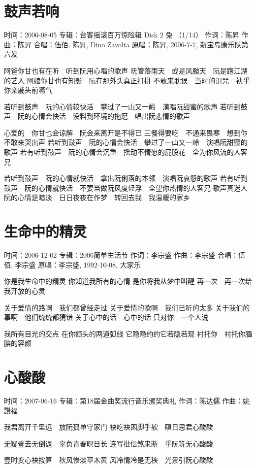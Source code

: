 \documentclass[UTF8,a4paper,oneside,twocolumn,12pt]{ctexbook}
\newcommand{\infopair}[2]{\textbullet #1：#2}
\newcommand{\zc}[1][伍佰]{\infopair{作词}{#1}}
\newcommand{\zq}[1][伍佰]{\infopair{作曲}{#1}}
\newcommand{\zj}[1]{\infopair{专辑}{#1}}
\newcommand{\yc}[1]{\infopair{原唱}{#1}}
\newcommand{\sj}[1]{\infopair{时间}{#1}}
\newenvironment{info}{\begin{flushleft}\kaishu
	}
	{\end{flushleft}\normalsize\yahei\par}
\newenvironment{lyric}{
	}
{}
\begin{document}
\section{鼓声若响}
\begin{info}
	\sj{2006-08-05}
	\zj{台客摇滚百万惊险辑 Disk 2 兔 （1/14）}
	\zc[陈昇]
	\zq[陈昇]
	\infopair{合唱}{伍佰, 陈昇, Dino Zavolta}
	\yc{陈昇, 2006-7-7, 新宝岛康乐队第六发}
\end{info}
\begin{lyric}
	阿爸你甘也有在听　听到阮用心唱的歌声
	呒管落雨天　或是风颱天　阮是跑江湖的艺人
	阿娘你甘也有知影　阮在那外头真正打拼
	不敢来耽误　当时的诅咒　袂乎你亲戚头前嚥气

	若听到鼓声　阮的心情较快活　攀过了一山又一岭　演唱阮甜蜜的歌声
	若听到鼓声　阮的心情会快活　没料到环境的拖磨　唱出阮悲情的歌声

	心爱的　你甘也会谅解　阮会来离开是不得已
	三餐得要吃　不通来畏寒　想到你不敢来哭出声
	若听到鼓声　阮的心情会快活　攀过了一山又一岭　演唱阮甜蜜的歌声
	若有听到鼓声　阮的心情会沉重　摇动不情愿的屁股花　全为你风流的人客兄

	若听到鼓声　阮的心情就快活　拿出阮俐落的本领　演唱阮哀怨的歌声
	若有听到鼓声　阮的心情就快活　不要当做阮风度轻浮　全望你热情的人客兄
	歌声真迷人　阮的心情是暗淡　日日夜夜在作梦　转回去我　我温暖的家乡
\end{lyric}

\section{生命中的精灵}
\begin{info}
	\sj{2006-12-02}
	\zj{2006简单生活节}
	\zc[李宗盛]
	\zq[李宗盛]
	\infopair{合唱}{伍佰, 李宗盛}
	\yc{李宗盛, 1992-10-08, 大家乐}
\end{info}
\begin{lyric}
	你是我生命中的精灵
	你知道我所有的心情
	是你将我从梦中叫醒
	再一次　再一次给我开放的心灵

	关于爱情的路啊　我们都曾经走过
	关于爱情的歌啊　我们已听的太多
	关于我们的事啊　他们统统都猜错
	关于心中的话　心中的话
	只对你　一个人说

	我所有目光的交点
	在你额头的两道弧线
	它隐隐约约它若隐若现
	衬托你　衬托你腼腆的容颜
\end{lyric}

\section{心酸酸}
\begin{info}
	\sj{2007-06-16}
	\zj{第18届金曲奖流行音乐颁奖典礼}
	\zc[陈达儒]
	\zq[姚讚福]
\end{info}
\begin{lyric}
	我君离开千里远　放阮孤单守家门
	袂吃袂困脚手软　瞑日思君心酸酸

	无疑壹去无倒返　辜负青春暝日长
	连写批信煞来断　乎阮等无心酸酸

	壹时变心袂按算　秋风惨淡草木黄
	风冷情冷是无秧　光景引阮心酸酸
\end{lyric}
\end{document}
